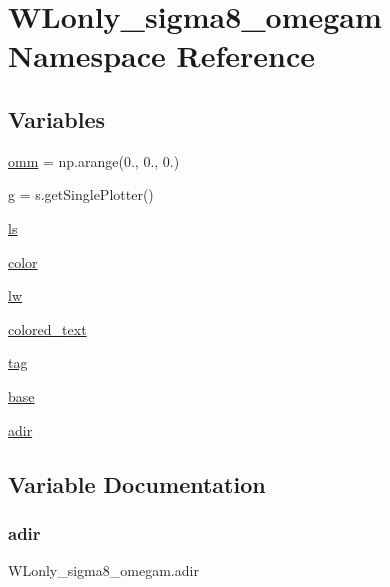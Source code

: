 \hypertarget{namespaceWLonly__sigma8__omegam}{}\section{W\+Lonly\+\_\+sigma8\+\_\+omegam Namespace Reference}
\label{namespaceWLonly__sigma8__omegam}
\subsection*{Variables}
\begin{DoxyCompactItemize}
\item 
\mbox{\hyperlink{namespaceWLonly__sigma8__omegam_a6fb97c7a557b5a48056d356bd21acb3f}{omm}} = np.\+arange(0., 0., 0.)
\item 
\mbox{\hyperlink{namespaceWLonly__sigma8__omegam_a879abc0b0089f48501a86d99a5c8f6ce}{g}} = s.\+get\+Single\+Plotter()
\item 
\mbox{\hyperlink{namespaceWLonly__sigma8__omegam_ae88f84fb35910ac5a98a362bebe55c99}{ls}}
\item 
\mbox{\hyperlink{namespaceWLonly__sigma8__omegam_a964d45c2cd17c11b88c5bdee61aae85b}{color}}
\item 
\mbox{\hyperlink{namespaceWLonly__sigma8__omegam_a92a43f8c734c055cd4d31a8359c62f50}{lw}}
\item 
\mbox{\hyperlink{namespaceWLonly__sigma8__omegam_ad15e0d7371eac90c77606540bd625ef5}{colored\+\_\+text}}
\item 
\mbox{\hyperlink{namespaceWLonly__sigma8__omegam_a5a36b7314bf7cce6cad456015072bf17}{tag}}
\item 
\mbox{\hyperlink{namespaceWLonly__sigma8__omegam_a35de0e4785db6fb2c1658f651ac7aacb}{base}}
\item 
\mbox{\hyperlink{namespaceWLonly__sigma8__omegam_a51b716b0ec6296d420e4cf5e139264dc}{adir}}
\end{DoxyCompactItemize}


\subsection{Variable Documentation}
\mbox{\label{namespaceWLonly__sigma8__omegam_a51b716b0ec6296d420e4cf5e139264dc}} 
\subsubsection{\texorpdfstring{adir}{adir}}
{\footnotesize\ttfamily W\+Lonly\+\_\+sigma8\+\_\+omegam.\+adir}

